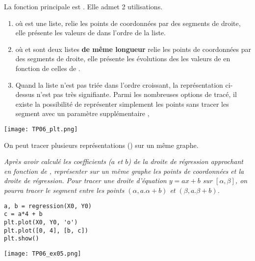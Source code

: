 \medskip

La fonction principale est . Elle admet 2 utilisations.
\begin{enumerate}
    \item {} où  est une liste, relie les points de coordonnées  par des segments de droite, elle présente les valeurs de  dans l'ordre de la liste.
    \item {} où  et  sont deux listes {\bf de même longueur} relie les points de coordonnées  par des segments de droite, elle présente les évolutions des les valeurs de  en fonction de celles de .
    \item Quand la liste n'est pas triée dans l'ordre croissant, la représentation ci-dessus n'est pas très signifiante. Parmi les nombreuses options de tracé, il existe la possibilité de représenter simplement les points sans tracer les segment avec un paramètre supplémentaire , 
\end{enumerate}
\begin{center}
\texttt{[image: TP06\_plt.png]} 
\end{center}

\vskip -1cm

On peut tracer plusieurs représentations () sur un même graphe.
\begin{Exercise}[title=Tracé de la droite de régression]
\it Après avoir calculé les coefficients ($a$ et $b$) de la droite de régression approchant  en fonction de , représenter sur un même graphe les points de coordonnées  et la droite de régression. Pour tracer une droite d'équation $y = ax + b$ sur $[\alpha, \beta]$, on pourra tracer le segment entre les points $(\alpha, a.\alpha + b)$ et $(\beta, a.\beta + b)$.
\end{Exercise}
\begin{Answer}
\begin{lstlisting}
a, b = regression(X0, Y0)
c = a*4 + b
plt.plot(X0, Y0, 'o')
plt.plot([0, 4], [b, c])
plt.show()
\end{lstlisting}
\begin{center}
\texttt{[image: TP06\_ex05.png]} 
\end{center}
\end{Answer}
